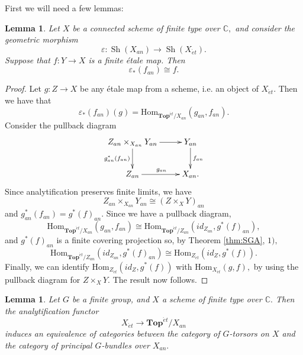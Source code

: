 \documentclass[12pt]{amsart}
\newtheorem{lemma}[dummy]{Lemma}
\theoremstyle{definition}
\newcommand{\bC}{\mathbb{C}}
\newcommand{\Sh}{\operatorname{Sh}}
\newcommand{\Hom}{\mathrm{Hom}}
\newcommand{\et}{\acute{e}t}
\def\Top{\mathbf{Top}}
\def\Top{\mathbf{Top}}
\begin{document}
First we will need a few lemmas:

\begin{lemma}\label{lem: finite cover}
Let $X$ be a connected scheme of finite type over $\bC,$ and consider the geometric morphism $$\varepsilon:\Sh\left(X_{an}\right) \to \Sh\left(X_{\et}\right).$$ Suppose that $f:Y \to X$ is a finite \'etale map. Then $$\varepsilon_*\left(f_{an}\right)\cong f.$$
\end{lemma}

\begin{proof}
Let $g:Z \to X$ be any \'etale map from a scheme, i.e. an object of $X_{\et}.$ Then we have that $$\varepsilon_*\left(f_{an}\right)\left(g\right)=\Hom_{\Top^{\et}/X_{an}}\left(g_{an},f_{an}\right).$$ Consider the pullback diagram
$$\xymatrix{Z_{an} \times_{X_{an}} Y_{an} \ar[r] \ar[d]_-{g_{an}^*\left(f_{an}\right)} & Y_{an} \ar[d]^-{f_{an}}\\
Z_{an} \ar[r]^{g_{an}} & X_{an}.}$$
Since analytification preserves finite limits, we have $$Z_{an} \times_{X_{an}} Y_{an}\cong \left(Z\times_X Y\right)_{an}$$ and $g_{an}^*\left(f_{an}\right)=g^*\left(f\right)_{an}.$ Since we have a pullback diagram, 
$$\Hom_{\Top^{\et}/X_{an}}\left(g_{an},f_{an}\right)\cong \Hom_{\Top^{\et}/Z_{an}}\left(id_{Z_{an}},g^*\left(f\right)_{an}\right),$$ and $g^*\left(f\right)_{an}$ is a finite covering projection so, by Theorem \ref{thm:SGA}, $1),$ 
$$\Hom_{\Top^{\et}/Z_{an}}\left(id_{Z_{an}},g^*\left(f\right)_{an}\right)\cong \Hom_{Z_{\et}}\left(id_Z,g^*\left(f\right)\right).$$ Finally, we can identify $\Hom_{Z_{\et}}\left(id_Z,g^*\left(f\right)\right)$ with $\Hom_{X_{\et}}\left(g,f\right),$ by using the pullback diagram for $Z \times_X Y.$ The result now follows.
\end{proof}

\begin{lemma}\label{lem: torsors}
Let $G$ be a finite group, and $X$ a scheme of finite type over $\bC.$ Then the analytification functor $$X_{\et} \to \Top^{\et}/X_{an}$$ induces an equivalence of categories between the category of $G$-torsors on $X$ and the category of principal $G$-bundles over $X_{an}.$
\end{lemma}
\end{document}
